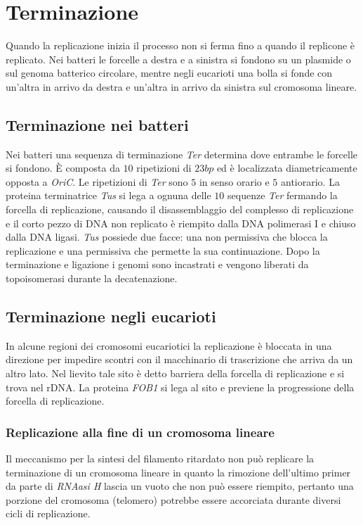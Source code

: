 \section{Terminazione}
Quando la replicazione inizia il processo non si ferma fino a quando il replicone \`e replicato. Nei batteri le forcelle a destra e a sinistra si fondono su un plasmide o sul genoma
batterico circolare, mentre negli eucarioti una bolla si fonde con un'altra in arrivo da destra e un'altra in arrivo da sinistra sul cromosoma lineare. 
\subsection{Terminazione nei batteri}
Nei batteri una sequenza di terminazione \emph{Ter} determina dove entrambe le forcelle si fondono. \`E composta da $10$ ripetizioni di $23bp$ ed \`e localizzata diametricamente opposta
a \emph{OriC}. Le ripetizioni di \emph{Ter} sono $5$ in senso orario e $5$ antiorario. La proteina terminatrice \emph{Tus} si lega a ognuna delle $10$ sequenze \emph{Ter} fermando 
la forcella di replicazione, causando il disassemblaggio del complesso di replicazione e il corto pezzo di DNA non replicato \`e riempito dalla DNA polimerasi I e chiuso dalla DNA
ligasi. \emph{Tus} possiede due facce: una non permissiva che blocca la replicazione e una permissiva che permette la sua continuazione. Dopo la terminazione e ligazione i genomi 
sono incastrati e vengono liberati da topoisomerasi durante la decatenazione. 
\subsection{Terminazione negli eucarioti}
In alcune regioni dei cromosomi eucariotici la replicazione \`e bloccata in una direzione per impedire scontri con il macchinario di trascrizione che arriva da un altro lato. Nel
lievito tale sito \`e detto barriera della forcella di replicazione e si trova nel rDNA. La proteina \emph{FOB1} si lega al sito e previene la progressione della forcella di replicazione.
\subsubsection{Replicazione alla fine di un cromosoma lineare}
Il meccanismo per la sintesi del filamento ritardato non pu\`o replicare la terminazione di un cromosoma lineare in quanto la rimozione dell'ultimo primer da parte di \emph{RNAasi 
H} lascia un vuoto che non pu\`o essere riempito, pertanto una porzione del cromosoma (telomero) potrebbe essere accorciata durante diversi cicli di replicazione. 
